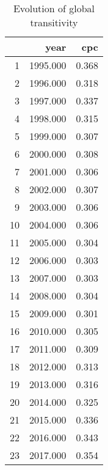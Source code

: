 \begin{table}[ht]
\centering
\begin{tabular}{rrr}
  \hline
 & year & cpc \\ 
  \hline
1 & 1995.000 & 0.368 \\ 
  2 & 1996.000 & 0.318 \\ 
  3 & 1997.000 & 0.337 \\ 
  4 & 1998.000 & 0.315 \\ 
  5 & 1999.000 & 0.307 \\ 
  6 & 2000.000 & 0.308 \\ 
  7 & 2001.000 & 0.306 \\ 
  8 & 2002.000 & 0.307 \\ 
  9 & 2003.000 & 0.306 \\ 
  10 & 2004.000 & 0.306 \\ 
  11 & 2005.000 & 0.304 \\ 
  12 & 2006.000 & 0.303 \\ 
  13 & 2007.000 & 0.303 \\ 
  14 & 2008.000 & 0.304 \\ 
  15 & 2009.000 & 0.301 \\ 
  16 & 2010.000 & 0.305 \\ 
  17 & 2011.000 & 0.309 \\ 
  18 & 2012.000 & 0.313 \\ 
  19 & 2013.000 & 0.316 \\ 
  20 & 2014.000 & 0.325 \\ 
  21 & 2015.000 & 0.336 \\ 
  22 & 2016.000 & 0.343 \\ 
  23 & 2017.000 & 0.354 \\ 
   \hline
\end{tabular}
\caption{Evolution of global transitivity} 
\end{table}
